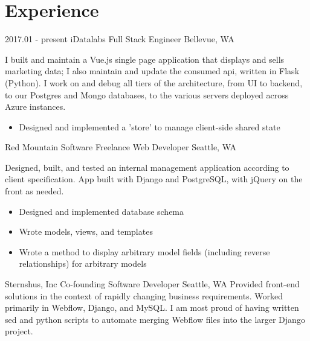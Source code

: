 \documentclass[10pt,a4paper,sans]{moderncv}        %
\begin{document}
\section{Experience}

\begin{comment}
  \cventry
  {date - date}
  {Employer}
  {Job Title}
  {}
  {City, State}
  {Description of work
    \begin{itemize}
    \item specific achievement
    \item specific achievement
    \end{itemize}}
\end{comment}

  \cventry
  {2017.01 - present}
  {iDatalabs}
  {Full Stack Engineer}
  {}
  {Bellevue, WA}
  {I built and maintain a Vue.js single page application that displays and sells
    marketing data; I also maintain and update the consumed api, written in
    Flask (Python). I work on and debug all tiers of the architecture, from UI
    to backend, to our Postgres and Mongo databases, to the various servers
    deployed across Azure instances.  
    \begin{itemize}
    \item Designed and implemented a 'store' to manage client-side shared state
    \end{itemize}}

 {Red Mountain Software} {Freelance Web Developer} {} {Seattle, WA} {Designed, built, and tested an internal management application according to client specification. App built with Django and PostgreSQL, with jQuery on the front as needed.
  \begin{itemize}
  \item Designed and implemented database schema
  \item Wrote models, views, and templates
  \item Wrote a method to display arbitrary model fields (including reverse relationships) for arbitrary models
  \end{itemize}}

 {Sternshus, Inc} {Co-founding Software Developer} {} {Seattle, WA} {Provided front-end solutions in the context of rapidly changing business requirements. Worked primarily in Webflow, Django, and MySQL. I am most proud of having written sed and python scripts to automate merging Webflow files into the larger Django project.}
\end{document}
